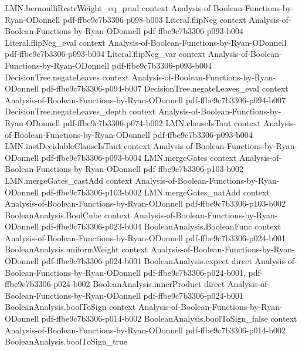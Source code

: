 \begin{lemma}
\proofstep
  {LMN.bernoulliRestrWeight_eq_prod}
  {context}
  {Analysis-of-Boolean-Functions-by-Ryan-ODonnell}
  {pdf-ffbe9c7b3306-p098-b003}
\proofstep
  {Literal.flipNeg}
  {context}
  {Analysis-of-Boolean-Functions-by-Ryan-ODonnell}
  {pdf-ffbe9c7b3306-p093-b004}
\proofstep
  {Literal.flipNeg_eval}
  {context}
  {Analysis-of-Boolean-Functions-by-Ryan-ODonnell}
  {pdf-ffbe9c7b3306-p093-b004}
\proofstep
  {Literal.flipNeg_var}
  {context}
  {Analysis-of-Boolean-Functions-by-Ryan-ODonnell}
  {pdf-ffbe9c7b3306-p093-b004}
\proofstep
  {DecisionTree.negateLeaves}
  {context}
  {Analysis-of-Boolean-Functions-by-Ryan-ODonnell}
  {pdf-ffbe9c7b3306-p094-b007}
\proofstep
  {DecisionTree.negateLeaves_eval}
  {context}
  {Analysis-of-Boolean-Functions-by-Ryan-ODonnell}
  {pdf-ffbe9c7b3306-p094-b007}
\proofstep
  {DecisionTree.negateLeaves_depth}
  {context}
  {Analysis-of-Boolean-Functions-by-Ryan-ODonnell}
  {pdf-ffbe9c7b3306-p074-b002}
\proofstep
  {LMN.clauseIsTaut}
  {context}
  {Analysis-of-Boolean-Functions-by-Ryan-ODonnell}
  {pdf-ffbe9c7b3306-p093-b004}
\proofstep
  {LMN.instDecidableClauseIsTaut}
  {context}
  {Analysis-of-Boolean-Functions-by-Ryan-ODonnell}
  {pdf-ffbe9c7b3306-p093-b004}
\proofstep
  {LMN.mergeGates}
  {context}
  {Analysis-of-Boolean-Functions-by-Ryan-ODonnell}
  {pdf-ffbe9c7b3306-p103-b002}
\proofstep
  {LMN.mergeGates_castAdd}
  {context}
  {Analysis-of-Boolean-Functions-by-Ryan-ODonnell}
  {pdf-ffbe9c7b3306-p103-b002}
\proofstep
  {LMN.mergeGates_natAdd}
  {context}
  {Analysis-of-Boolean-Functions-by-Ryan-ODonnell}
  {pdf-ffbe9c7b3306-p103-b002}
\proofstep
  {BooleanAnalysis.BoolCube}
  {context}
  {Analysis-of-Boolean-Functions-by-Ryan-ODonnell}
  {pdf-ffbe9c7b3306-p023-b004}
\proofstep
  {BooleanAnalysis.BooleanFunc}
  {context}
  {Analysis-of-Boolean-Functions-by-Ryan-ODonnell}
  {pdf-ffbe9c7b3306-p024-b001}
\proofstep
  {BooleanAnalysis.uniformWeight}
  {context}
  {Analysis-of-Boolean-Functions-by-Ryan-ODonnell}
  {pdf-ffbe9c7b3306-p024-b001}
\proofstep
  {BooleanAnalysis.expect}
  {direct}
  {Analysis-of-Boolean-Functions-by-Ryan-ODonnell}
  {pdf-ffbe9c7b3306-p024-b001,
    pdf-ffbe9c7b3306-p024-b002}
\proofstep
  {BooleanAnalysis.innerProduct}
  {direct}
  {Analysis-of-Boolean-Functions-by-Ryan-ODonnell}
  {pdf-ffbe9c7b3306-p024-b001}
\proofstep
  {BooleanAnalysis.boolToSign}
  {context}
  {Analysis-of-Boolean-Functions-by-Ryan-ODonnell}
  {pdf-ffbe9c7b3306-p014-b002}
\proofstep
  {BooleanAnalysis.boolToSign_false}
  {context}
  {Analysis-of-Boolean-Functions-by-Ryan-ODonnell}
  {pdf-ffbe9c7b3306-p014-b002}
\proofstep
  {BooleanAnalysis.boolToSign_true}

\end{lemma}

